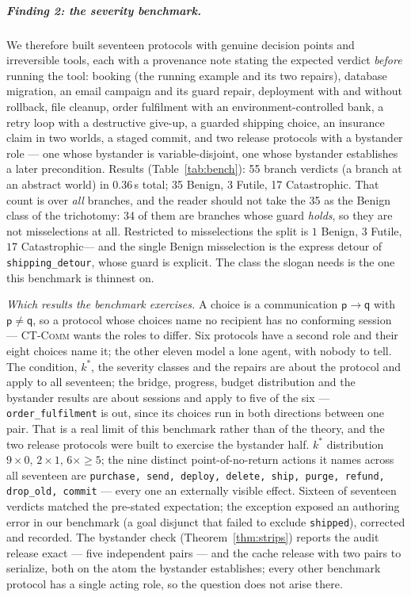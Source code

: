 \documentclass[a4paper,UKenglish,cleveref,autoref,thm-restate,anonymous]{lipics-v2021}
\newcommand{\Ben}{\textsf{Benign}}
\newcommand{\Fut}{\textsf{Futile}}
\newcommand{\Cat}{\textsf{Catastrophic}}
\newcommand{\kstar}{k^{*}}
\begin{document}
\subparagraph*{Finding 2: the severity benchmark.}
We therefore built seventeen protocols with genuine decision points and
irreversible tools, each with a provenance note stating the expected verdict
\emph{before} running the tool: booking (the running example and its two
repairs), database migration, an email campaign and its guard repair,
deployment with and without rollback, file cleanup, order fulfilment with an
environment-controlled bank, a retry loop with a destructive give-up, a
guarded shipping choice, an insurance claim in two worlds, a staged
commit, and two release protocols with a bystander role --- one whose
bystander is variable-disjoint, one whose bystander establishes a later
precondition. Results (Table~\ref{tab:bench}): 55 branch verdicts (a branch at an
abstract world) in 0.36\,s total; 35 \Ben{}, 3 \Fut{}, 17 \Cat{}. That
count is over \emph{all} branches, and the reader should not take the 35 as
the \Ben{} class of the trichotomy: 34 of them are branches whose guard
\emph{holds}, so they are not misselections at all. Restricted to
misselections the split is $1$ \Ben, $3$ \Fut, $17$ \Cat --- and the single
\Ben{} misselection is the express detour of \texttt{shipping\_detour}, whose
guard is explicit. The class the slogan needs is the one this benchmark is
thinnest on.

\emph{Which results the benchmark exercises.} A choice is a communication
$\mathsf p{\to}\mathsf q$ with $\mathsf p\neq\mathsf q$, so a protocol whose
choices name no recipient has no conforming session --- \textsc{CT-Comm} wants
the roles to differ. Six protocols have a second role and their eight choices
name it; the other eleven model a lone agent, with nobody to tell. The
condition, $\kstar$, the severity classes and the repairs are about the protocol
and apply to all seventeen; the bridge, progress, budget distribution and the
bystander results are about sessions and apply to five of the six ---
\texttt{order\_fulfilment} is out, since its choices run in both directions
between one pair. That is a real limit of this benchmark rather
than of the theory, and the two release protocols were built to exercise the
bystander half. $\kstar$ distribution $9\times 0$,
$2\times 1$, $6\times{\ge}5$; the nine distinct point-of-no-return actions it
names across all seventeen are \texttt{purchase, send, deploy, delete, ship,
purge, refund, drop\_old, commit} --- every one an externally visible effect. Sixteen of seventeen
verdicts matched the pre-stated expectation; the exception exposed an
authoring error in our benchmark (a goal disjunct that failed to exclude
\texttt{shipped}), corrected and recorded. The bystander check
(Theorem~\ref{thm:strips}) reports the audit release exact --- five
independent pairs --- and the cache release with two pairs to serialize, both
on the atom the bystander establishes; every other benchmark protocol has a
single acting role, so the question does not arise there.
\end{document}
